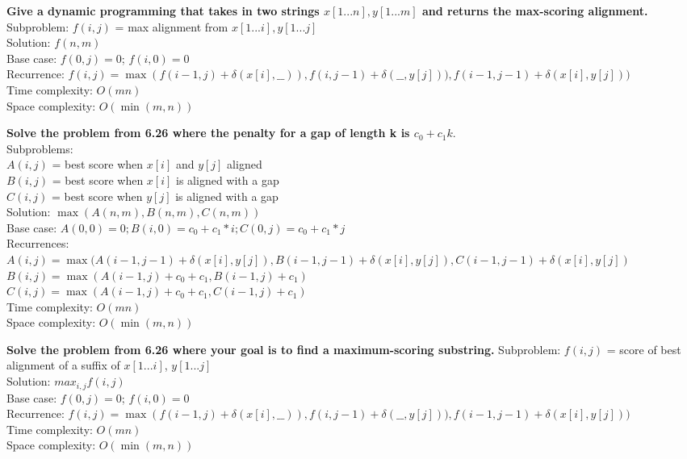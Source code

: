 \begin{problem}{6.26}
    \textbf{Give a dynamic programming that takes in two strings $x[1...n], y[1...m]$ and returns the max-scoring alignment.} \\
    Subproblem: $f(i, j)$ = max alignment from $x[1...i], y[1...j]$ \\
    Solution: $f(n, m)$ \\
    Base case: $f(0, j) = 0$; $f(i, 0) = 0$ \\
    Recurrence: $f(i, j) = \max(f(i - 1, j) + \delta(x[i],\_\_)), f(i, j - 1) + \delta(\_\_, y[j])), f(i - 1, j - 1) + \delta(x[i], y[j]))$ \\
    Time complexity: $O(mn)$ \\
    Space complexity: $O(\min(m, n))$
\end{problem}

\begin{problem}{6.27}
    \textbf{Solve the problem from 6.26 where the penalty for a gap of length k is $c_0 + c_1k$}. \\
    Subproblems: 
        \\ $A(i, j)$ = best score when $x[i]$ and $y[j]$ aligned \\
        $B(i, j)$ = best score when $x[i]$ is aligned with a gap \\
        $C(i, j)$ = best score when $y[j]$ is aligned with a gap \\
    Solution: $\max(A(n, m), B(n, m), C(n, m))$ \\
    Base case: $A(0, 0) = 0; B(i, 0) = c_0 + c_1 * i; C(0, j) = c_0 + c_1 * j$ \\
    Recurrences: \\
    $A(i, j) = \max(A(i - 1, j - 1) + \delta(x[i], y[j]), B(i - 1, j - 1) + \delta(x[i], y[j]), C(i - 1, j - 1) + \delta(x[i], y[j])$ \\
    $B(i,  j) = \max(A(i - 1, j) + c_0 + c_1, B(i - 1, j) + c_1)$ \\
    $C(i,  j) = \max(A(i - 1, j) + c_0 + c_1, C(i - 1, j) + c_1)$ \\
    Time complexity: $O(mn)$ \\
    Space complexity: $O(\min(m, n))$
\end{problem}

\begin{problem}
    \textbf{Solve the problem from 6.26 where your goal is to find a maximum-scoring substring.}
    Subproblem: $f(i, j)$ = score of best alignment of a suffix of $x[1...i]$, $y[1...j]$ \\
    Solution: $max_{i, j} f(i, j)$ \\
    Base case: $f(0, j) = 0$; $f(i, 0) = 0$ \\
    Recurrence: $f(i, j) = \max(f(i - 1, j) + \delta(x[i],\_\_)), f(i, j - 1) + \delta(\_\_, y[j])), f(i - 1, j - 1) + \delta(x[i], y[j]))$ \\
    Time complexity: $O(mn)$ \\
    Space complexity: $O(\min(m, n))$
\end{problem}
